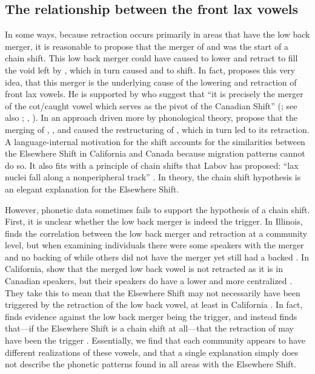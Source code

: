 \subsection{The relationship between the front lax vowels}
\label{sec:relationship_between_front_lax_vowels}

In some ways, because \trap retraction occurs primarily in areas that have the low back merger, it is reasonable to propose that the merger of \lot and \thought was the start of a chain shift. This low back merger could have caused \trap to lower and retract to fill the void left by \lot, which in turn caused \dress and \kit to shift. In fact, \citet[139]{gordon_2006} proposes this very idea, that this merger is the underlying cause of the lowering and retraction of front lax vowels. He is supported by \citeauthor{clarke_etal_1995} who suggest that ``it is precisely the merger of the cot/caught vowel which serves as the pivot of the Canadian Shift'' (\citeyear[212]{clarke_etal_1995}; see also \citealt{dedecker_mackenzie_2000}; \citealt[220]{labov_ash_boberg_2006_anae}, \citealt{boberg_2019}). In an approach driven more by phonological theory, \citet{roeder_gardner_2013} propose that the merging of \lot, \thought, and \palm caused the restructuring of \trap, which in turn led to its retraction. A language-internal motivation for the shift accounts for the similarities between the Elsewhere Shift in California and Canada because migration patterns cannot do so. It also fits with a principle of chain shifts that Labov has proposed: ``lax nuclei fall along a nonperipheral track'' \citeyearpar[194]{labov_1994}. In theory, the chain shift hypothesis is an elegant explanation for the Elsewhere Shift.

However, phonetic data sometimes fails to support the hypothesis of a chain shift. First, it is unclear whether the low back merger is indeed the trigger. In Illinois, \citet{bigham_2010} finds the correlation between the low back merger and \trap retraction at a community level, but when examining individuals there were some speakers with the merger and no backing of \trap while others did not have the merger yet still had a backed \trap. In California, \citet[51]{kennedy_grama_2012} show that the merged low back vowel is not retracted as it is in Canadian speakers, but their speakers do have a lower and more centralized \trap. They take this to mean that the Elsewhere Shift may not necessarily have been triggered by the retraction of the low back vowel, at least in California \citep[see also][]{grama_kennedy_2018}. In fact, \citet[121]{holland_2014_diss} finds evidence against the low back merger being the trigger, and instead finds that---if the Elsewhere Shift is a chain shift at all---that the retraction of \dress may have been the trigger \citep[see also]{holland_2019}. Essentially, we find that each community appears to have different realizations of these vowels, and that a single explanation simply does not describe the phonetic patterns found in all areas with the Elsewhere Shift.

